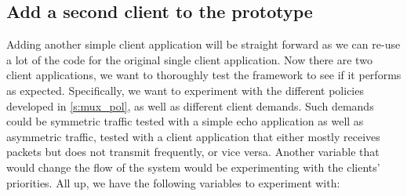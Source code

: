 \subsection{Add a second client to the prototype}\label{s:client2}
Adding another simple client application will be straight forward as we can re-use a lot of the code for the 
original single client application. Now there are two client applications, we want to thoroughly test the
framework to see if it performs as expected. Specifically, we want to experiment with the different 
policies developed in \autoref{s:mux_pol}, as well as different client demands. Such demands could be
symmetric traffic tested with a simple echo application as well as asymmetric traffic, tested with a client
application that either mostly receives packets but does not transmit frequently, or vice versa. Another variable
that would change the flow of the system would be experimenting with the clients' priorities. All up, we have the
following variables to experiment with:

